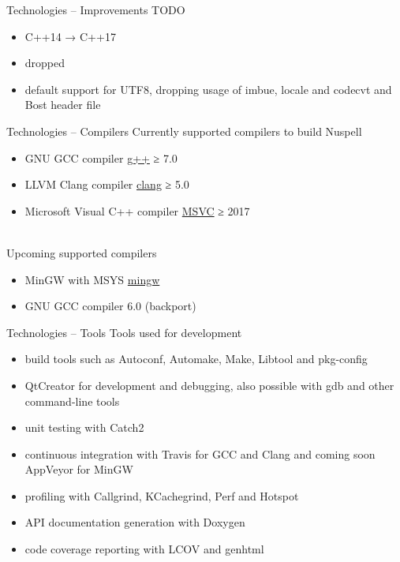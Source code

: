 \documentclass{beamer}
\begin{document}
\begin{frame}{Technologies – Improvements}
TODO
\\\mbox{}
\begin{itemize}
\item C++14 → C++17
\item dropped
\item default support for UTF8, dropping usage of imbue, locale and codecvt and Bost header file
\end{itemize}
\end{frame}

\begin{frame}{Technologies – Compilers}
Currently supported compilers to build Nuspell
\begin{itemize}
\item GNU GCC compiler \href{https://gcc.gnu.org/}{g++} ≥ 7.0
\item LLVM Clang compiler \href{https://clang.llvm.org/}{clang} ≥ 5.0
\item Microsoft Visual C++ compiler \href{https://docs.microsoft.com/en-us/cpp/}{MSVC} ≥ 2017
\end{itemize}
\mbox{}\\
Upcoming supported compilers
\begin{itemize}
\item MinGW with MSYS \href{http://mingw.org/}{mingw}
\item GNU GCC compiler 6.0 (backport)
\end{itemize}
\end{frame}

\begin{frame}{Technologies – Tools}
Tools used for development
\begin{itemize}
\item build tools such as Autoconf, Automake, Make, Libtool and pkg-config
\item QtCreator for development and debugging, also possible with gdb and other command-line tools
\item unit testing with Catch2
\item continuous integration with Travis for GCC and Clang and coming soon AppVeyor for MinGW
\item profiling with Callgrind, KCachegrind, Perf and Hotspot
\item API documentation generation with Doxygen
\item code coverage reporting with LCOV and genhtml
\end{itemize}
\end{frame}
\end{document}
